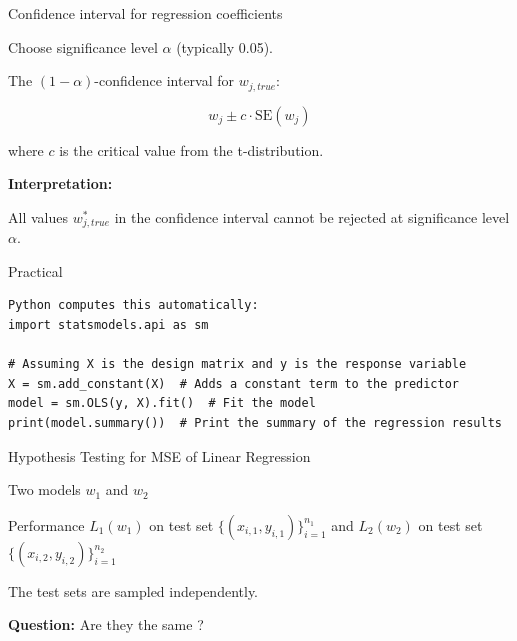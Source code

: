 \documentclass{beamer}
\begin{document}
\begin{frame}{Confidence interval for regression coefficients}

Choose significance level $\alpha$ (typically 0.05).

\vspace{0.3cm}

The $(1-\alpha)$-confidence interval for $w_{j,true}$:

\[
w_j \pm c \cdot \text{SE}(w_j)
\]

where $c$ is the critical value from the t-distribution.

\vspace{0.3cm}

\textbf{Interpretation:}

All values $w_{j,true}^*$ in the confidence interval cannot be rejected at significance level $\alpha$.

\end{frame}
\begin{frame}[fragile]{Practical}

\begin{verbatim}
Python computes this automatically:
import statsmodels.api as sm

# Assuming X is the design matrix and y is the response variable
X = sm.add_constant(X)  # Adds a constant term to the predictor
model = sm.OLS(y, X).fit()  # Fit the model
print(model.summary())  # Print the summary of the regression results
\end{verbatim}
\end{frame}
\begin{frame}{Hypothesis Testing for MSE of Linear Regression}

 Two models $w_1$ and $w_2$

 \medskip

 Performance $L_1(w_1)$ on test set $\{(x_{i,1}, y_{i,1})\}_{i=1}^{n_1}$ and $L_2(w_2)$ on test set $\{(x_{i,2}, y_{i,2})\}_{i=1}^{n_2}$

 \medskip

 The test sets are sampled independently. 

\textbf{Question:}  
 Are they the same ?

\end{frame}
\end{document}
